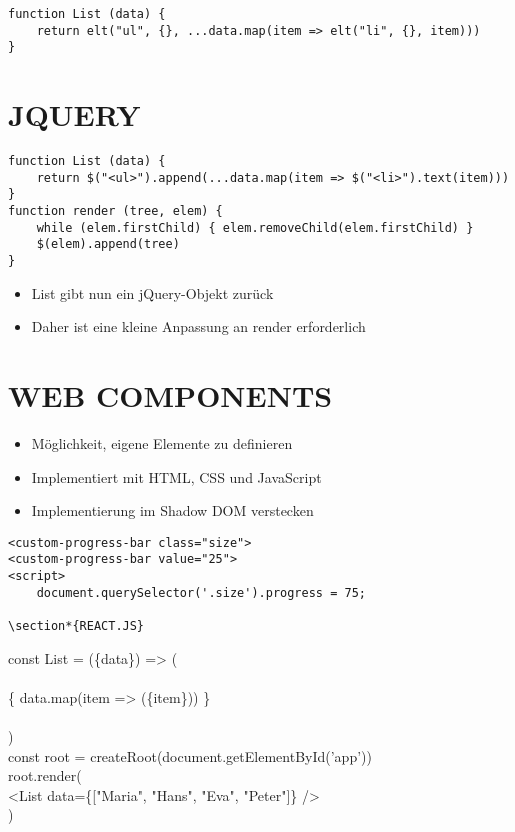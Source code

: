 \begin{verbatim}
function List (data) {
    return elt("ul", {}, ...data.map(item => elt("li", {}, item)))
}
\end{verbatim}

\section*{JQUERY}
\begin{verbatim}
function List (data) {
    return $("<ul>").append(...data.map(item => $("<li>").text(item)))
}
function render (tree, elem) {
    while (elem.firstChild) { elem.removeChild(elem.firstChild) }
    $(elem).append(tree)
}
\end{verbatim}

\begin{itemize}
  \item List gibt nun ein jQuery-Objekt zurück
  \item Daher ist eine kleine Anpassung an render erforderlich
\end{itemize}

\section*{WEB COMPONENTS}
\begin{itemize}
  \item Möglichkeit, eigene Elemente zu definieren
  \item Implementiert mit HTML, CSS und JavaScript
  \item Implementierung im Shadow DOM verstecken
\end{itemize}

\begin{verbatim}
<custom-progress-bar class="size">
<custom-progress-bar value="25">
<script>
    document.querySelector('.size').progress = 75;

\section*{REACT.JS}
\end{verbatim}

const List = (\{data\}) => (\\
\\
\{ data.map(item => (\{item\})) \}\\
\\
)\\
const root = createRoot(document.getElementById('app'))\\
root.render(\\[0pt]
<List data=\{["Maria", "Hans", "Eva", "Peter"]\} />\\
)

